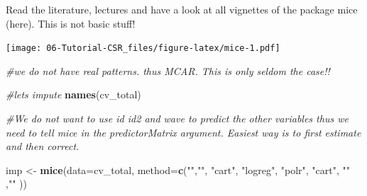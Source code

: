 \documentclass[
]{book}
\newenvironment{Shaded}{\begin{snugshade}}{\end{snugshade}}
\newcommand{\CommentTok}[1]{\textcolor[rgb]{0.56,0.35,0.01}{\textit{#1}}}
\newcommand{\DataTypeTok}[1]{\textcolor[rgb]{0.13,0.29,0.53}{#1}}
\newcommand{\DecValTok}[1]{\textcolor[rgb]{0.00,0.00,0.81}{#1}}
\newcommand{\KeywordTok}[1]{\textcolor[rgb]{0.13,0.29,0.53}{\textbf{#1}}}
\newcommand{\NormalTok}[1]{#1}
\newcommand{\OperatorTok}[1]{\textcolor[rgb]{0.81,0.36,0.00}{\textbf{#1}}}
\newcommand{\OtherTok}[1]{\textcolor[rgb]{0.56,0.35,0.01}{#1}}
\newcommand{\StringTok}[1]{\textcolor[rgb]{0.31,0.60,0.02}{#1}}
\begin{document}
Read the literature, lectures and have a look at all vignettes of the package mice (here). This is not basic stuff!

\begin{Shaded}
\end{Shaded}

\texttt{[image: 06-Tutorial-CSR\_files/figure-latex/mice-1.pdf]}

\begin{Shaded}
\begin{Highlighting}[numbers=left,,]
\CommentTok{#we do not have real patterns. thus MCAR. This is only seldom the case!!}

\CommentTok{#lets impute}
\KeywordTok{names}\NormalTok{(cv_total)}

\CommentTok{#We do not want to use id id2 and wave to predict the other variables thus we need to tell mice in the predictorMatrix argument. Easiest way is to first estimate and then correct. }

\NormalTok{imp <-}\StringTok{ }\KeywordTok{mice}\NormalTok{(}\DataTypeTok{data=}\NormalTok{cv_total, }\DataTypeTok{method=}\KeywordTok{c}\NormalTok{(}\StringTok{""}\NormalTok{,}\StringTok{""}\NormalTok{, }\StringTok{"cart"}\NormalTok{, }\StringTok{"logreg"}\NormalTok{,    }\StringTok{"polr"}\NormalTok{,  }\StringTok{"cart"}\NormalTok{, }\StringTok{""}\NormalTok{ ,}\StringTok{""}\NormalTok{  ))}
\end{Highlighting}
\end{Shaded}
\end{document}
